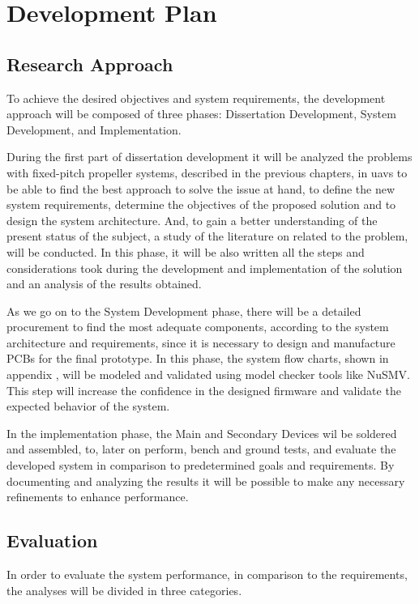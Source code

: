 \chapter{Development Plan}
\label{chap:Chapter5}
\section{Research Approach}
To achieve the desired objectives and system requirements, the development approach will be composed of three phases: Dissertation Development, System Development, and Implementation.

During the first part of dissertation development it will be analyzed the problems with fixed-pitch propeller systems, described in the previous chapters, in \glspl{uav} to be able to find the best approach to solve the issue at hand, to define the new system requirements, determine the objectives of the proposed solution and to design the system architecture.
And, to gain a better understanding of the present status of the subject, a study of the literature on related to the problem, will be conducted.
In this phase, it will be also written all the steps and considerations took during the development and implementation of the solution and an analysis of the results obtained.

As we go on to the System Development phase, there will be a detailed procurement to find the most adequate components, according to the system architecture and requirements, since it is necessary to design and manufacture \glspl{PCB} for the final prototype.
In this phase, the system flow charts, shown in appendix , will be modeled and validated using model checker tools like NuSMV.
This step will increase the confidence in the designed firmware and validate the expected behavior of the system.

In the implementation phase, the Main and Secondary Devices wil be soldered and assembled, to, later on perform, bench and ground tests, and evaluate the developed system in comparison to predetermined goals and requirements.
By documenting and analyzing the results it will be possible to make any necessary refinements to enhance performance.


\section{Evaluation}
In order to evaluate the system performance, in comparison to the requirements, the analyses will be divided in three categories.

